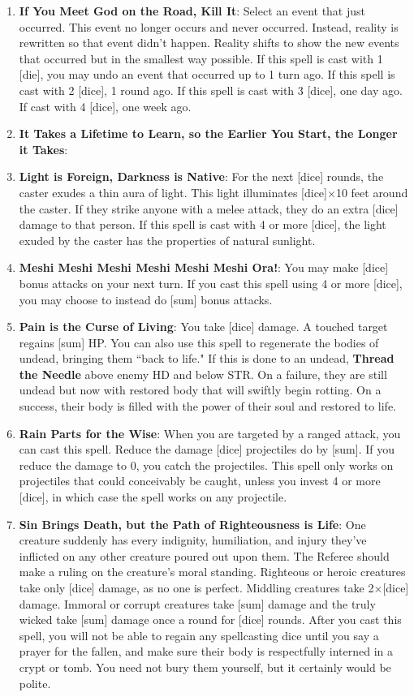 \documentclass[twoside]{article}
\newcommand{\TTN}[2]{\textbf{Thread the Needle} above #1 and below #2}
\begin{document}
\begin{enumerate}[nosep]
\item \textbf{If You Meet God on the Road, Kill It}: Select an event that just occurred. This event no longer occurs and never occurred. Instead, reality is rewritten so that event didn't happen. Reality shifts to show the new events that occurred but in the smallest way possible. If this spell is cast with 1 [die], you may undo an event that occurred up to 1 turn ago. If this spell is cast with 2 [dice], 1 round ago. If this spell is cast with 3 [dice], one day ago. If cast with 4 [dice], one week ago. 
\item \textbf{It Takes a Lifetime to Learn, so the Earlier You Start, the Longer it Takes}:
\item \textbf{Light is Foreign, Darkness is Native}: For the next [dice] rounds, the caster exudes a thin aura of light. This light illuminates [dice]$\times$10 feet around the caster. If they strike anyone with a melee attack, they do an extra [dice] damage to that person. If this spell is cast with 4 or more [dice], the light exuded by the caster has the properties of natural sunlight.
\item \textbf{Meshi Meshi Meshi Meshi Meshi Meshi Ora!}: You may make [dice] bonus attacks on your next turn. If you cast this spell using 4 or more [dice], you may choose to instead do [sum] bonus attacks.
\item \textbf{Pain is the Curse of Living}: You take [dice] damage. A touched target regains [sum] HP. You can also use this spell to regenerate the bodies of undead, bringing them ``back to life." If this is done to an undead, \TTN{enemy HD}{STR}. On a failure, they are still undead but now with restored body that will swiftly begin rotting. On a success, their body is filled with the power of their soul and restored to life.
\item \textbf{Rain Parts for the Wise}: When you are targeted by a ranged attack, you can cast this spell. Reduce the damage [dice] projectiles do by [sum]. If you reduce the damage to 0, you catch the projectiles. This spell only works on projectiles that could conceivably be caught, unless you invest 4 or more [dice], in which case the spell works on any projectile.
\item \textbf{Sin Brings Death, but the Path of Righteousness is Life}: One creature suddenly has every indignity, humiliation, and injury they've inflicted on any other creature poured out upon them. The Referee should make a ruling on the creature's moral standing. Righteous or heroic creatures take only [dice] damage, as no one is perfect. Middling creatures take 2$\times$[dice] damage. Immoral or corrupt creatures take [sum] damage and the truly wicked take [sum] damage once a round for [dice] rounds. After you cast this spell, you will not be able to regain any spellcasting dice until you say a prayer for the fallen, and make sure their body is respectfully interned in a crypt or tomb. You need not bury them yourself, but it certainly would be polite.

\end{enumerate}
\end{document}
